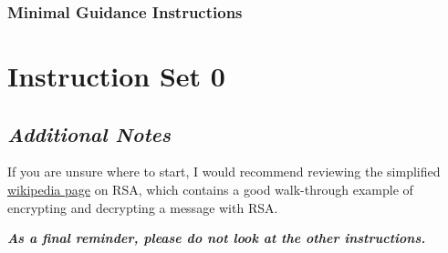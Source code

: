 






        \newpage







        \subsubsection{Minimal Guidance Instructions}







            {\parindent0pt\singlespacing







                \section*{Instruction Set 0}







                    \subsection*{\textit{Additional Notes}}







                        If you are unsure where to start, I would recommend reviewing the simplified \href{https://simple.wikipedia.org/wiki/RSA_algorithm}{wikipedia page} on RSA, which contains a good walk-through example of encrypting and decrypting a message with RSA.















                    \textbf{\textit{As a final reminder, please do not look at the other instructions.}}







            }







